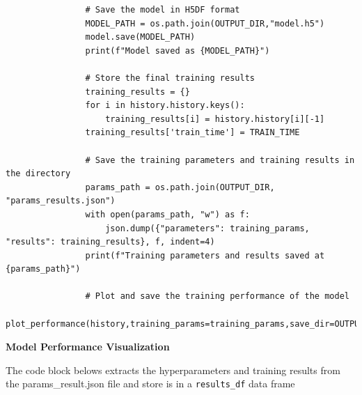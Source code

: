 \documentclass[a4paper]{article}
\begin{document}
\begin{lstlisting}
                # Save the model in H5DF format
                MODEL_PATH = os.path.join(OUTPUT_DIR,"model.h5")
                model.save(MODEL_PATH)
                print(f"Model saved as {MODEL_PATH}")

                # Store the final training results
                training_results = {}
                for i in history.history.keys():
                    training_results[i] = history.history[i][-1]
                training_results['train_time'] = TRAIN_TIME
                
                # Save the training parameters and training results in the directory
                params_path = os.path.join(OUTPUT_DIR, "params_results.json")
                with open(params_path, "w") as f:
                    json.dump({"parameters": training_params, "results": training_results}, f, indent=4)
                print(f"Training parameters and results saved at {params_path}")

                # Plot and save the training performance of the model
                plot_performance(history,training_params=training_params,save_dir=OUTPUT_DIR)
\end{lstlisting}

\textbf{Model Performance Visualization}

The code block belows extracts the hyperparameters and training results from the params\_result.json file and store is in a \lstinline{results_df} data frame
\end{document}
